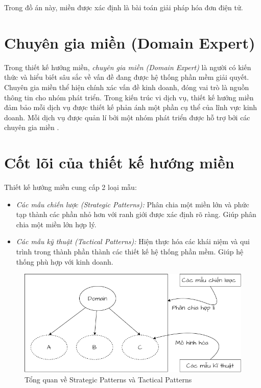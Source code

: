 \begin{example} Trong đồ án này, miền được xác định là bài toán giải pháp hóa đơn điện tử.     \end{example}
\section{Chuyên gia  miền    (Domain Expert)}

Trong thiết kế hướng miền, \emph{chuyên gia  miền    (Domain Expert)} là người có kiến thức và hiểu biết sâu sắc về vấn đề đang được hệ thống phần mềm giải quyết. Chuyên gia  miền    thể hiện chính xác vấn đề kinh doanh, đóng vai trò là nguồn thông tin cho nhóm phát triển.         Trong kiến trúc vi dịch vụ, thiết kế hướng miền đảm bảo mỗi dịch vụ được thiết kế phản ánh một phần cụ thể của lĩnh vực kinh doanh. Mỗi dịch vụ được quản lí bởi một nhóm phát triển được hỗ trợ bởi các chuyên gia  miền   . 


\section{Cốt lõi của thiết kế hướng miền}


Thiết kế hướng miền cung cấp 2 loại mẫu:

\begin{itemize}

    \item \emph{Các mẫu chiến lược (Strategic Patterns):} Phân chia một miền lớn và phức tạp thành các phần nhỏ hơn với ranh giới được xác định rõ ràng. Giúp phân chia một miền lớn hợp lý.

    \item \emph{Các mẫu kỹ thuật (Tactical Patterns):} Hiện thực hóa các khái niệm và qui trình trong thành phần thành các thiết kế hệ thống phần mềm. Giúp hệ thống phù hợp với kinh doanh.

\end{itemize}

\begin{figure}[H]

    \centering

    \includegraphics[scale = 0.5]{pictures/cac_mau_chien_luoc_va_cac_mau_ky_thuat/main.drawio.png}

    \caption{Tổng quan về Strategic Patterns và Tactical Patterns}

\end{figure}

